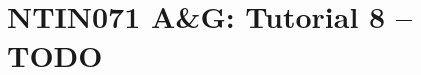 \documentclass[a4paper,12pt]{amsart}
\begin{document}

\section*{NTIN071 A\&G: Tutorial 8 -- TODO}


\medskip


\medskip
\end{document}
